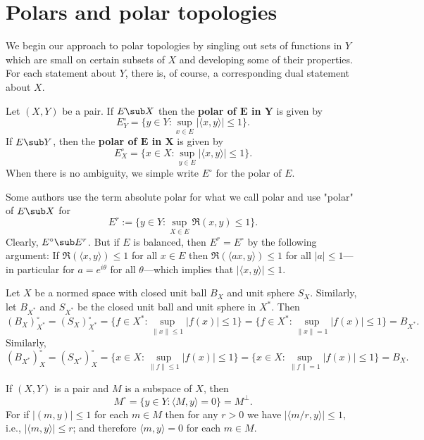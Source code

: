 \section{Polars and polar topologies}
We begin our approach to polar topologies by singling out sets of functions in $Y$ which are small on certain subsets of $X$ and developing some of their properties. For each statement about $Y$, there is, of course, a corresponding dual statement about $X$.
\begin{definition}
Let $(X,Y)$ be a pair. If $E\sub X$ then the \textbf{polar of $\bm{E}$ in $\bm{Y}$} is given by
\[E^{\circ}_Y=\{y\in Y:\sup_{x\in E}|\langle x,y\rangle|\leq 1\}.\]
If $E\sub Y$, then the \textbf{polar of $\bm{E}$ in $\bm{X}$} is given by
\[E^{\circ}_X=\{x\in X:\sup_{y\in E}|\langle x,y\rangle|\leq 1\}.\]
When there is no ambiguity, we simple write $E^\circ$ for the polar of $E$.
\end{definition}
\begin{remark}\label{absolute polar}
Some authors use the term absolute polar for what we call polar and use "polar" of $E\sub X$ for 
\[E^r:=\{y\in Y:\sup_{X\in E}\Re(x,y)\leq 1\}.\]
Clearly, $E^\circ\sub E^{r}$. But if $E$ is balanced, then $E^r=E^\circ$ by the following argument: If $\Re(\langle x,y\rangle)\leq 1$ for all $x\in E$ then $\Re(\langle ax,y\rangle)\leq 1$ for all $|a|\leq 1$---in particular for $a=e^{i\theta}$ for all $\theta$---which implies that $|\langle x,y\rangle|\leq 1$.
\end{remark}
\begin{example}\label{polar of closed unit ball}
Let $X$ be a normed space with closed unit ball $B_X$ and unit sphere $S_X$. Similarly, let $B_{X^*}$ and $S_{X^*}$ be the closed unit ball and unit sphere in $X^*$. Then
\[(B_X)^{\circ}_{X^*}=(S_{X})_{X^*}^\circ=\{f\in X^*:\sup_{\|x\|\leq 1}|f(x)|\leq 1\}=\{f\in X^*:\sup_{\|x\|=1}|f(x)|\leq 1\}=B_{X^*}.\]
Similarly,
\[(B_{X^*})^\circ_X=(S_{X^*})^\circ_X=\{x\in X:\sup_{\|f\|\leq 1}|f(x)|\leq 1\}=\{x\in X:\sup_{\|f\|=1}|f(x)|\leq 1\}=B_{X}.\]
\end{example}
\begin{example}\label{polar of subspace}
If $(X,Y)$ is a pair and $M$ is a subspace of $X$, then
\[M^\circ=\{y\in Y:\langle M,y\rangle=0\}=M^{\bot}.\]
For if $|(m,y)|\leq 1$ for each $m\in M$ then for any $r>0$ we have $|\langle m/r,y\rangle|\leq 1$, i.e., $|\langle m,y\rangle|\leq r$; and therefore $\langle m,y\rangle=0$ for each $m\in M$.
\end{example}
